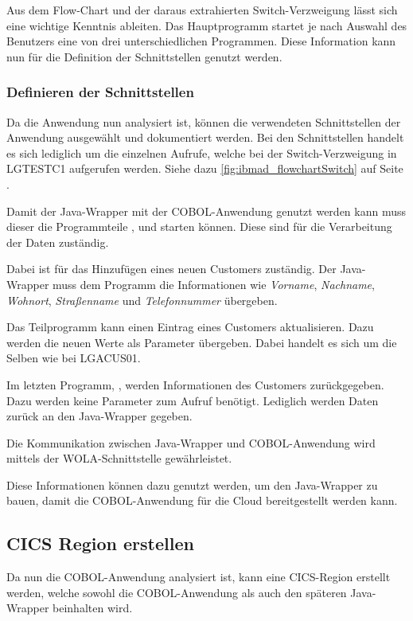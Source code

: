 Aus dem Flow-Chart und der daraus extrahierten Switch-Verzweigung lässt sich eine wichtige Kenntnis ableiten. Das
Hauptprogramm startet je nach Auswahl des Benutzers eine von drei unterschiedlichen Programmen. Diese Information kann
nun für die Definition der Schnittstellen genutzt werden.

\subsubsection{Definieren der Schnittstellen}
Da die Anwendung nun analysiert ist, können die verwendeten Schnittstellen der Anwendung ausgewählt und dokumentiert
werden. Bei den Schnittstellen handelt es sich lediglich um die einzelnen Aufrufe, welche bei der Switch-Verzweigung
in LGTESTC1 aufgerufen werden. Siehe dazu \ref{fig:ibmad_flowchartSwitch} auf Seite \pageref{fig:ibmad_flowchartSwitch}.

Damit der Java-Wrapper mit der COBOL-Anwendung genutzt werden kann muss dieser die Programmteile ,
 und  starten können. Diese sind für die Verarbeitung der Daten zuständig.

Dabei ist  für das Hinzufügen eines neuen Customers zuständig. Der Java-Wrapper muss dem Programm die
Informationen wie \textit{Vorname}, \textit{Nachname}, \textit{Wohnort}, \textit{Straßenname} und \textit{Telefonnummer}
übergeben.

Das Teilprogramm  kann einen Eintrag eines Customers aktualisieren. Dazu werden die neuen Werte als
Parameter übergeben. Dabei handelt es sich um die Selben wie bei LGACUS01.

Im letzten Programm, , werden Informationen des Customers zurückgegeben. Dazu werden keine Parameter zum
Aufruf benötigt. Lediglich werden Daten zurück an den Java-Wrapper gegeben.

Die Kommunikation zwischen Java-Wrapper und COBOL-Anwendung wird mittels der WOLA-Schnittstelle gewährleistet.

Diese Informationen können dazu genutzt werden, um den Java-Wrapper zu bauen, damit die COBOL-Anwendung für die Cloud
bereitgestellt werden kann.

\subsection{CICS Region erstellen}
Da nun die COBOL-Anwendung analysiert ist, kann eine CICS-Region erstellt werden, welche sowohl die COBOL-Anwendung
als auch den späteren Java-Wrapper beinhalten wird.

